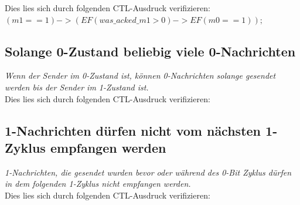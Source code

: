 \documentclass[]{scrartcl}
\begin{document}
Dies lies sich durch folgenden CTL-Ausdruck verifizieren: \\

$(m1 == 1) -> (EF (was\_acked\_m1 > 0) -> EF (m0 == 1));$

\subsection{Solange 0-Zustand beliebig viele 0-Nachrichten}

\textit{Wenn der Sender im 0-Zustand ist, können 0-Nachrichten solange gesendet werden bis der
Sender im 1-Zustand ist.}\\

Dies lies sich durch folgenden CTL-Ausdruck verifizieren: \\

\subsection{1-Nachrichten dürfen nicht vom nächsten 1-Zyklus empfangen werden}

\textit{1-Nachrichten, die gesendet wurden bevor oder während des 0-Bit Zyklus dürfen in dem
folgenden 1-Zyklus nicht empfangen werden.}\\

Dies lies sich durch folgenden CTL-Ausdruck verifizieren: \\
\end{document}
